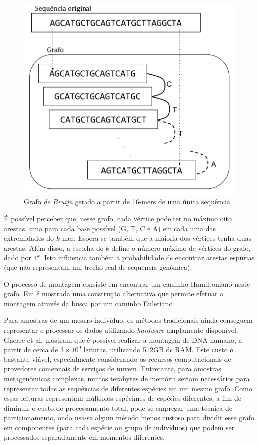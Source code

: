 \begin{figure}[!htbp]
  \centering
  \includegraphics[scale=0.6]{figures/graph_dna_bruijn.pdf}
  \caption{Grafo \emph{de Bruijn} gerado a partir de 16-mers de uma única sequência}
  \label{fig:graph_dna_bruijn}
\end{figure}

É possível perceber que, nesse grafo, cada vértice pode ter no máximo oito arestas, uma para cada base possível (G, T, C e A) em cada uma das extremidades do $k$-mer. Espera-se também que a maioria dos vértices tenha duas arestas. Além disso, a escolha de $k$ define o número máximo de vértices do grafo, dado por $4^k$. Isto influencia também a probabilidade de encontrar arestas espúrias (que não representam um trecho real de sequência genômica).

O processo de montagem consiste em encontrar um caminho Hamiltoniano neste grafo. Em \cite{pevzner2001eulerian} é mostrada uma construção alternativa que permite efetuar a montagem através da busca por um caminho Euleriano.

Para amostras de um mesmo indivíduo, os métodos tradicionais ainda conseguem representar e processar os dados utilizando \emph{hardware} amplamente disponível. Gnerre et al. \cite{gnerre2011high} mostram que é possível realizar a montagem de DNA humano, a partir de cerca de $3 \times 10^9$ leituras, utilizando 512GB de RAM. Este custo é bastante viável, especialmente considerando os recursos computacionais de provedores comerciais de serviços de nuvem. Entretanto, para amostras metagenômicas complexas, muitos terabytes de memória seriam necessários para representar todas as sequências de diferentes espécies em um mesmo grafo. Como essas leituras representam múltiplos espécimes de espécies diferentes, a fim de diminuir o custo de processamento total, pode-se empregar uma técnica de particionamento, onda usa-se algum método menos custoso para dividir esse grafo em componentes (para cada espécie ou grupo de indivíduos) que podem ser processados separadamente em momentos diferentes.

